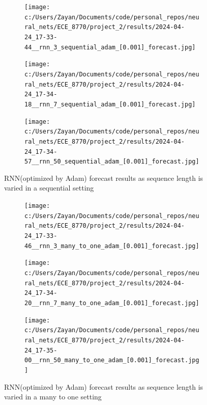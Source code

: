 \documentclass[12pt, letterpaper]{article}
\begin{document}
\begin{figure}[htpb]
    \centering
    \begin{subfigure}[b]{0.3\textwidth}
        \texttt{[image: c:/Users/Zayan/Documents/code/personal\_repos/neural\_nets/ECE\_8770/project\_2/results/2024-04-24\_17-33-44\_\_rnn\_3\_sequential\_adam\_[0.001]\_forecast.jpg]}
    \end{subfigure}
    \begin{subfigure}[b]{0.3\textwidth}
        \texttt{[image: c:/Users/Zayan/Documents/code/personal\_repos/neural\_nets/ECE\_8770/project\_2/results/2024-04-24\_17-34-18\_\_rnn\_7\_sequential\_adam\_[0.001]\_forecast.jpg]}
    \end{subfigure}
    \begin{subfigure}[b]{0.3\textwidth}
        \texttt{[image: c:/Users/Zayan/Documents/code/personal\_repos/neural\_nets/ECE\_8770/project\_2/results/2024-04-24\_17-34-57\_\_rnn\_50\_sequential\_adam\_[0.001]\_forecast.jpg]}
    \end{subfigure}
    \caption{RNN(optimized by Adam) forecast results as sequence length is varied in a sequential setting}
    \label{fig: Adam-RNN forecast results as sequence length is varied in a sequential setting}
\end{figure}

\begin{figure}[htpb]
    \centering
    \begin{subfigure}[b]{0.3\textwidth}
        \texttt{[image: c:/Users/Zayan/Documents/code/personal\_repos/neural\_nets/ECE\_8770/project\_2/results/2024-04-24\_17-33-46\_\_rnn\_3\_many\_to\_one\_adam\_[0.001]\_forecast.jpg]}
    \end{subfigure}
    \begin{subfigure}[b]{0.3\textwidth}
        \texttt{[image: c:/Users/Zayan/Documents/code/personal\_repos/neural\_nets/ECE\_8770/project\_2/results/2024-04-24\_17-34-20\_\_rnn\_7\_many\_to\_one\_adam\_[0.001]\_forecast.jpg]}
    \end{subfigure}
    \begin{subfigure}[b]{0.3\textwidth}
        \texttt{[image: c:/Users/Zayan/Documents/code/personal\_repos/neural\_nets/ECE\_8770/project\_2/results/2024-04-24\_17-35-00\_\_rnn\_50\_many\_to\_one\_adam\_[0.001]\_forecast.jpg]}
    \end{subfigure}
    \caption{RNN(optimized by Adam) forecast results as sequence length is varied in a many to one setting}
    \label{fig: Adam-RNN forecast results as sequence length is varied in a many-to-one setting}
\end{figure}
\end{document}
